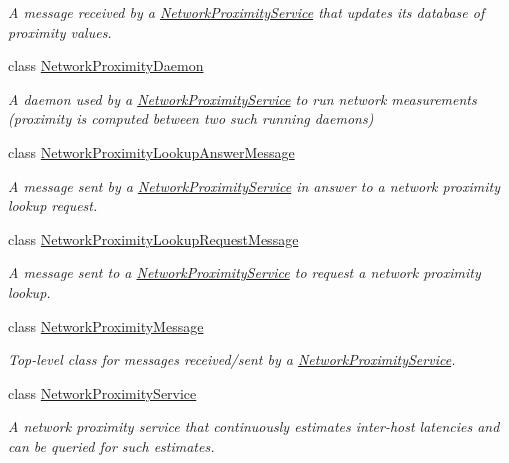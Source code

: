 \begin{DoxyCompactItemize}
\begin{DoxyCompactList}\small\item\em A message received by a \hyperlink{classwrench_1_1_network_proximity_service}{Network\+Proximity\+Service} that updates its database of proximity values. \end{DoxyCompactList}\item 
class \hyperlink{classwrench_1_1_network_proximity_daemon}{Network\+Proximity\+Daemon}
\begin{DoxyCompactList}\small\item\em A daemon used by a \hyperlink{classwrench_1_1_network_proximity_service}{Network\+Proximity\+Service} to run network measurements (proximity is computed between two such running daemons) \end{DoxyCompactList}\item 
class \hyperlink{classwrench_1_1_network_proximity_lookup_answer_message}{Network\+Proximity\+Lookup\+Answer\+Message}
\begin{DoxyCompactList}\small\item\em A message sent by a \hyperlink{classwrench_1_1_network_proximity_service}{Network\+Proximity\+Service} in answer to a network proximity lookup request. \end{DoxyCompactList}\item 
class \hyperlink{classwrench_1_1_network_proximity_lookup_request_message}{Network\+Proximity\+Lookup\+Request\+Message}
\begin{DoxyCompactList}\small\item\em A message sent to a \hyperlink{classwrench_1_1_network_proximity_service}{Network\+Proximity\+Service} to request a network proximity lookup. \end{DoxyCompactList}\item 
class \hyperlink{classwrench_1_1_network_proximity_message}{Network\+Proximity\+Message}
\begin{DoxyCompactList}\small\item\em Top-\/level class for messages received/sent by a \hyperlink{classwrench_1_1_network_proximity_service}{Network\+Proximity\+Service}. \end{DoxyCompactList}\item 
class \hyperlink{classwrench_1_1_network_proximity_service}{Network\+Proximity\+Service}
\begin{DoxyCompactList}\small\item\em A network proximity service that continuously estimates inter-\/host latencies and can be queried for such estimates. \end{DoxyCompactList}\item 

\end{DoxyCompactItemize}
